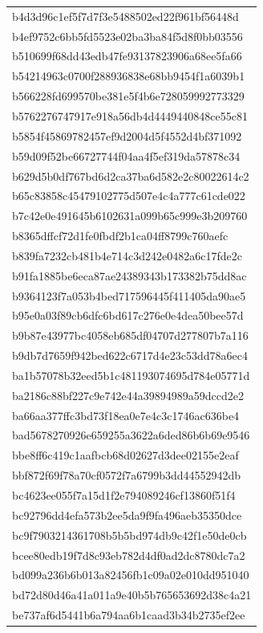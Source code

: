 \begin{tabular}{l}
b4d3d96c1ef5f7d7f3e5488502ed22f961bf56448d \\
b4ef9752c6bb5fd5523e02ba3ba84f5d8f0bb03556 \\
b510699f68dd43edb47fe93137823906a68ee5fa66 \\
b54214963c0700f288936838e68bb9454f1a6039b1 \\
b566228fd699570be381e5f4b6e728059992773329 \\
b5762276747917e918a56db4d4449440848ce55c81 \\
b5854f45869782457ef9d2004d5f4552d4bf371092 \\
b59d09f52be66727744f04aa4f5ef319da57878c34 \\
b629d5b0df767bd6d2ca37ba6d582e2c80022614c2 \\
b65c83858c45479102775d507e4c4a777c61cde022 \\
b7c42e0e491645b6102631a099b65c999e3b209760 \\
b8365dffcf72d1fe0fbdf2b1ca04ff8799c760aefc \\
b839fa7232cb481b4e714c3d242e0482a6c17fde2c \\
b91fa1885be6eca87ae24389343b173382b75dd8ac \\
b9364123f7a053b4bed717596445f411405da90ae5 \\
b95e0a03f89cb6dfc6bd617c276e0e4dea50bee57d \\
b9b87e43977bc4058eb685df04707d277807b7a116 \\
b9db7d7659f942bed622c6717d4e23c53dd78a6ec4 \\
ba1b57078b32eed5b1c481193074695d784e05771d \\
ba2186c88bf227c9e742e44a39894989a59dccd2e2 \\
ba66aa377ffc3bd73f18ea0e7e4c3c1746ac636be4 \\
bad5678270926e659255a3622a6ded86b6b69e9546 \\
bbe8ff6c419c1aafbcb68d02627d3dee02155e2eaf \\
bbf872f69f78a70cf0572f7a6799b3dd44552942db \\
bc4623ee055f7a15d1f2e794089246cf13860f51f4 \\
bc92796dd4efa573b2ee5da9f9fa496aeb35350dce \\
bc9f7903214361708b5b5bd974db9c42f1e50de0cb \\
bcee80edb19f7d8c93eb782d4df0ad2dc8780dc7a2 \\
bd099a236b6b013a82456fb1c09a02e010dd951040 \\
bd72d80d46a41a011a9e40b5b765653692d38c4a21 \\
be737af6d5441b6a794aa6b1caad3b34b2735ef2ee \\

\end{tabular}
